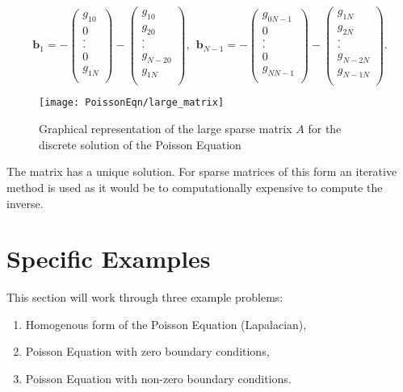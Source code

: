 \[
\mathbf{b}_1 =-\left(\begin{array}{c}
g_{10}\\
0\\
.\\
.\\
0\\
g_{1N}\\
\end{array}\right)-\left(\begin{array}{c}
g_{10}\\
g_{20}\\
.\\
.\\
g_{N-20}\\
g_{1N}\\
\end{array}\right), \ \ 
\mathbf{b}_{N-1} =-\left(\begin{array}{c}
g_{0N-1}\\
0\\
.\\
.\\
0\\
g_{NN-1}\\
\end{array}\right)-\left(\begin{array}{c}
g_{1N}\\
g_{2N}\\
.\\
.\\
g_{N-2N}\\
g_{N-1N}\\
\end{array}\right).\]

\begin{figure}[H]
  \caption{Graphical representation of the large sparse matrix $A$ for the discrete solution of the Poisson Equation}\label{SparseMatrix}
  \centering
    \texttt{[image: PoissonEqn/large\_matrix]}
\end{figure}

The matrix has a unique solution. For sparse matrices of this form an iterative method is used as it would be to computationally expensive to compute the inverse.
\section{Specific Examples}
This section will work through three example problems:
\begin{enumerate}
    \item Homogenous form of the Poisson Equation (Lapalacian),
    \item Poisson Equation with zero boundary conditions,
    \item Poisson Equation with non-zero boundary conditions.
\end{enumerate}
